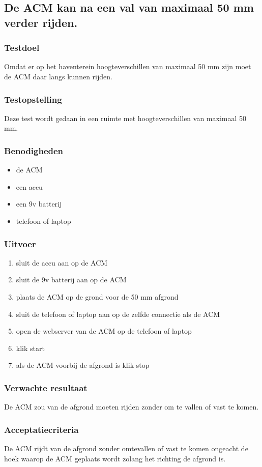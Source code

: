 
\subsection{De ACM kan na een val van maximaal 50 mm verder rijden.}
\subsubsection{Testdoel}
\begin{flushleft}
    Omdat er op het haventerein hoogteverschillen van maximaal 50 mm zijn moet de ACM daar langs kunnen rijden.
\end{flushleft}
\subsubsection{Testopstelling}
\begin{flushleft}
    Deze test wordt gedaan in een ruimte met hoogteverschillen van maximaal 50 mm.
\end{flushleft}
\subsubsection{Benodigheden}

\begin{itemize}
    \item de ACM
    \item een accu
    \item een 9v batterij
    \item telefoon of laptop
\end{itemize}
\subsubsection{Uitvoer}
\begin{enumerate}
    \item sluit de accu aan op de ACM
    \item sluit de 9v batterij aan op de ACM
    \item plaats de ACM op de grond voor de 50 mm afgrond
    \item sluit de telefoon of laptop aan op de zelfde connectie als de ACM
    \item open de webserver van de ACM op de telefoon of laptop
    \item klik start
    \item als de ACM voorbij de afgrond is klik stop
\end{enumerate}
\subsubsection{Verwachte resultaat}
\begin{flushleft}
    De ACM zou van de afgrond moeten rijden zonder om te vallen of vast te komen.
\end{flushleft}
\subsubsection{Acceptatiecriteria}
\begin{flushleft}
    De ACM rijdt van de afgrond zonder omtevallen of vast te komen ongeacht de hoek waarop de ACM geplaats wordt zolang het richting de afgrond is.
\end{flushleft}